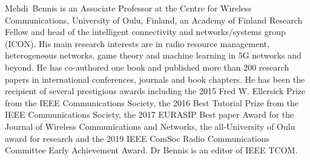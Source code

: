 \documentclass[conference]{IEEEtran}
\begin{document}
\begin{IEEEbiography}
Mehdi~Bennis is an Associate Professor at the Centre for Wireless Communications, University of Oulu, Finland, an Academy of Finland Research Fellow and head of the intelligent connectivity and networks/systems group (ICON). His main research interests are in radio resource management, heterogeneous networks, game theory and machine learning in 5G networks and beyond. He has co-authored one book and published more than 200 research papers in international conferences, journals and book chapters. He has been the recipient of several prestigious awards including the 2015 Fred W. Ellersick Prize from the IEEE Communications Society, the 2016 Best Tutorial Prize from the IEEE Communications Society, the 2017 EURASIP Best paper Award for the Journal of Wireless Communications and Networks, the all-University of Oulu award for research and the 2019 IEEE ComSoc Radio Communications Committee Early Achievement Award. Dr Bennis is an editor of IEEE TCOM.
\end{IEEEbiography}
\end{document}
